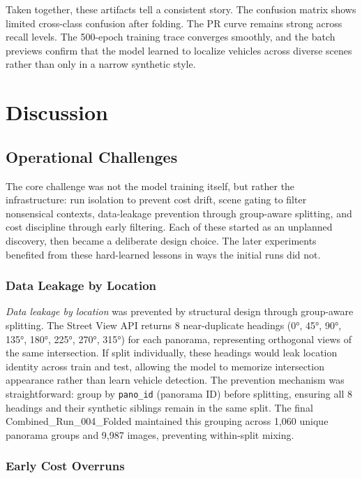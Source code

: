 \documentclass[12pt,a4paper]{article}
\begin{document}
Taken together, these artifacts tell a consistent story. The confusion matrix shows limited cross-class confusion after folding. The PR curve remains strong across recall levels. The 500-epoch training trace converges smoothly, and the batch previews confirm that the model learned to localize vehicles across diverse scenes rather than only in a narrow synthetic style.

\section{Discussion}

\subsection{Operational Challenges}

The core challenge was not the model training itself, but rather the infrastructure: run isolation to prevent cost drift, scene gating to filter nonsensical contexts, data-leakage prevention through group-aware splitting, and cost discipline through early filtering. Each of these started as an unplanned discovery, then became a deliberate design choice. The later experiments benefited from these hard-learned lessons in ways the initial runs did not.

\subsubsection{Data Leakage by Location}

\emph{Data leakage by location} was prevented by structural design through group-aware splitting. The Street View API returns 8 near-duplicate headings (0°, 45°, 90°, 135°, 180°, 225°, 270°, 315°) for each panorama, representing orthogonal views of the same intersection. If split individually, these headings would leak location identity across train and test, allowing the model to memorize intersection appearance rather than learn vehicle detection. The prevention mechanism was straightforward: group by \texttt{pano\_id} (panorama ID) before splitting, ensuring all 8 headings and their synthetic siblings remain in the same split. The final Combined\_Run\_004\_Folded maintained this grouping across 1,060 unique panorama groups and 9,987 images, preventing within-split mixing.

\subsubsection{Early Cost Overruns}
\end{document}
